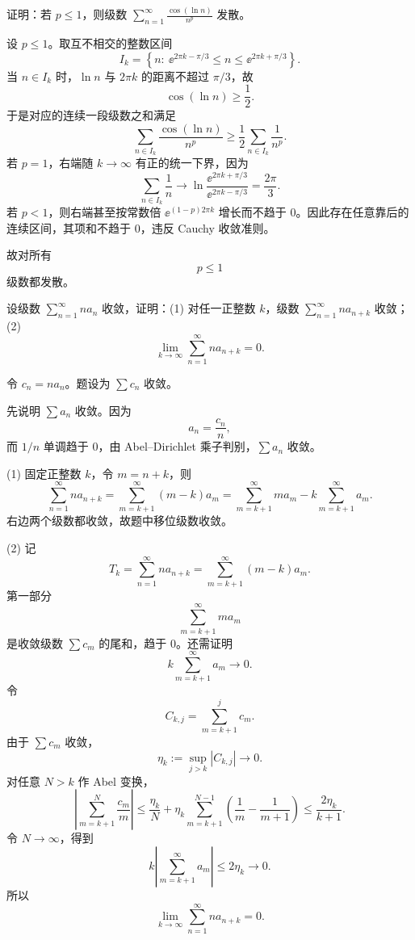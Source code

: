 \begin{xreferenceproblem}[9]
证明：若 $p\leq1$，则级数 $\sum_{n=1}^{\infty}\frac{\cos(\ln n)}{n^p}$ 发散。
\end{xreferenceproblem}
\begin{xsolution}
设 $p\leq1$。取互不相交的整数区间
\[
 I_k=\left\{n:\ \ee^{2\pi k-\pi/3}\leq n\leq\ee^{2\pi k+\pi/3}\right\}.
\]
当 $n\in I_k$ 时，$\ln n$ 与 $2\pi k$ 的距离不超过 $\pi/3$，故
\[
 \cos(\ln n)\geq\frac12.
\]
于是对应的连续一段级数之和满足
\[
 \sum_{n\in I_k}\frac{\cos(\ln n)}{n^p}
 \geq\frac12\sum_{n\in I_k}\frac1{n^p}.
\]
若 $p=1$，右端随 $k\to\infty$ 有正的统一下界，因为
\[
 \sum_{n\in I_k}\frac1n
 \longrightarrow \ln\frac{\ee^{2\pi k+\pi/3}}{\ee^{2\pi k-\pi/3}}
 =\frac{2\pi}{3}.
\]
若 $p<1$，则右端甚至按常数倍 $\ee^{(1-p)2\pi k}$ 增长而不趋于 $0$。因此存在任意靠后的连续区间，其项和不趋于 $0$，违反 Cauchy 收敛准则。

故对所有
\[
 \boxed{p\leq1}
\]
级数都发散。
\end{xsolution}


\begin{xreferenceproblem}[10]
设级数 $\sum_{n=1}^{\infty}na_n$ 收敛，证明：(1) 对任一正整数 $k$，级数 $\sum_{n=1}^{\infty}na_{n+k}$ 收敛；(2)
\[
\lim_{k\to\infty}\sum_{n=1}^{\infty}na_{n+k}=0.
\]
\end{xreferenceproblem}
\begin{xsolution}
令 $c_n=na_n$。题设为 $\sum c_n$ 收敛。

先说明 $\sum a_n$ 收敛。因为
\[
 a_n=\frac{c_n}{n},
\]
而 $1/n$ 单调趋于 $0$，由 Abel--Dirichlet 乘子判别，$\sum a_n$ 收敛。

(1) 固定正整数 $k$，令 $m=n+k$，则
\[
 \sum_{n=1}^{\infty}na_{n+k}
 =\sum_{m=k+1}^{\infty}(m-k)a_m
 =\sum_{m=k+1}^{\infty}ma_m-k\sum_{m=k+1}^{\infty}a_m.
\]
右边两个级数都收敛，故题中移位级数收敛。

(2) 记
\[
 T_k=\sum_{n=1}^{\infty}na_{n+k}
 =\sum_{m=k+1}^{\infty}(m-k)a_m.
\]
第一部分
\[
 \sum_{m=k+1}^{\infty}ma_m
\]
是收敛级数 $\sum c_m$ 的尾和，趋于 $0$。还需证明
\[
 k\sum_{m=k+1}^{\infty}a_m\to0.
\]
令
\[
 C_{k,j}=\sum_{m=k+1}^{j}c_m.
\]
由于 $\sum c_m$ 收敛，
\[
 \eta_k:=\sup_{j>k}|C_{k,j}|\longrightarrow0.
\]
对任意 $N>k$ 作 Abel 变换，
\[
 \left|\sum_{m=k+1}^{N}\frac{c_m}{m}\right|
 \leq\frac{\eta_k}{N}+\eta_k\sum_{m=k+1}^{N-1}\left(\frac1m-\frac1{m+1}\right)
 \leq\frac{2\eta_k}{k+1}.
\]
令 $N\to\infty$，得到
\[
 k\left|\sum_{m=k+1}^{\infty}a_m\right|
 \leq2\eta_k\longrightarrow0.
\]
所以
\[
 \boxed{\lim_{k\to\infty}\sum_{n=1}^{\infty}na_{n+k}=0.}
\]
\end{xsolution}


